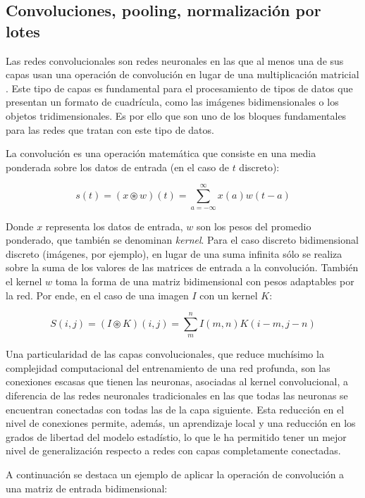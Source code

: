 \documentclass[12pt, spanish]{article}
\begin{document}

\subsection{Convoluciones, pooling, normalización por lotes}

Las redes convolucionales son redes neuronales en las que al menos una de sus capas
usan una operación de convolución en lugar de una multiplicación matricial
\cite{goodfellow2016deep}. Este tipo de capas es fundamental para el procesamiento
de tipos de datos que presentan un formato de cuadrícula, como las imágenes
bidimensionales o los objetos tridimensionales. Es por ello que son uno de los
bloques fundamentales para las redes que tratan con este tipo de datos.

La convolución es una operación matemática que consiste en una media ponderada sobre
los datos de entrada (en el caso de \(t\) discreto):

\[s(t) = (x \circledast w)(t) = \sum_{a = -\infty}^{\infty} x(a)w(t-a) \]

Donde \(x\) representa los datos de entrada, \(w\) son los pesos del promedio
ponderado, que también se denominan \textit{kernel}.
Para el caso discreto bidimensional discreto (imágenes, por ejemplo), en lugar de
una suma infinita sólo se realiza sobre la suma de los valores de las matrices de
entrada a la convolución. También el kernel \(w\) toma la forma de una matriz
bidimensional con pesos adaptables por la red. Por ende, en el caso de una imagen
\(I\) con un kernel \(K\):

\[S(i,j)=(I \circledast K)(i,j)=\sum_{m}^{n} I(m,n)K(i-m,j-n)\]

Una particularidad de las capas convolucionales, que reduce muchísimo la
complejidad computacional del entrenamiento de una red profunda, son las conexiones
escasas que tienen las neuronas, asociadas al kernel convolucional, a diferencia de
las redes neuronales tradicionales en las que todas las neuronas se encuentran
conectadas con todas las de la capa siguiente. Esta reducción en el nivel de
conexiones permite, además, un aprendizaje local y una reducción en los grados de
libertad del modelo estadístio, lo que le ha permitido tener un mejor nivel de
generalización respecto a redes con capas completamente conectadas.

A continuación se destaca un ejemplo de aplicar la operación de convolución a una
matriz de entrada bidimensional:
\end{document}
